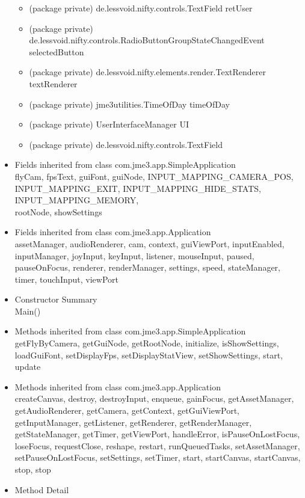 \documentclass[letterpaper]{article}
\begin{document}
\begin{itemize}
\begin{itemize}
								\item	(package private) de.lessvoid.nifty.controls.TextField	retUser 
								\item	(package private) de.lessvoid.nifty.controls.RadioButtonGroupStateChangedEvent	selectedButton 
								\item	(package private) de.lessvoid.nifty.elements.render.TextRenderer	textRenderer 
								\item	(package private) jme3utilities.TimeOfDay	timeOfDay 
								\item	(package private) UserInterfaceManager	UI 
								\item	(package private) de.lessvoid.nifty.controls.TextField
							\end{itemize} 
					\item	Fields inherited from class com.jme3.app.SimpleApplication \\
							flyCam, fpsText, guiFont, guiNode, INPUT\_MAPPING\_CAMERA\_POS, \\ INPUT\_MAPPING\_EXIT, INPUT\_MAPPING\_HIDE\_STATS, INPUT\_MAPPING\_MEMORY, \\ rootNode, showSettings
					\item	Fields inherited from class com.jme3.app.Application \\
							assetManager, audioRenderer, cam, context, guiViewPort, inputEnabled, inputManager, joyInput, keyInput, listener, mouseInput, paused, pauseOnFocus, renderer, renderManager, settings, speed, stateManager, timer, touchInput, viewPort
					\item	Constructor Summary \\
							Main()
					\item	Methods inherited from class com.jme3.app.SimpleApplication \\
							getFlyByCamera, getGuiNode, getRootNode, initialize, isShowSettings, loadGuiFont, setDisplayFps, setDisplayStatView, setShowSettings, start, update
					\item	Methods inherited from class com.jme3.app.Application \\
							createCanvas, destroy, destroyInput, enqueue, gainFocus, getAssetManager, getAudioRenderer, getCamera, getContext, getGuiViewPort, getInputManager, getListener, getRenderer, getRenderManager, getStateManager, getTimer, getViewPort, handleError, isPauseOnLostFocus, loseFocus, requestClose, reshape, restart, runQueuedTasks, setAssetManager, setPauseOnLostFocus, setSettings, setTimer, start, startCanvas, startCanvas, stop, stop
					\item	Method Detail

\end{itemize}
\end{document}
